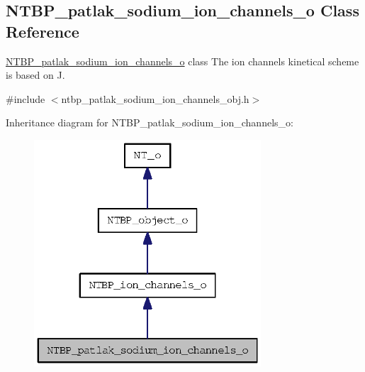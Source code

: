 \subsection{NTBP\_\-patlak\_\-sodium\_\-ion\_\-channels\_\-o Class Reference}
\label{class_n_t_b_p__patlak__sodium__ion__channels__o}


\hyperlink{class_n_t_b_p__patlak__sodium__ion__channels__o}{NTBP\_\-patlak\_\-sodium\_\-ion\_\-channels\_\-o} class The ion channels kinetical scheme is based on J.  




{\ttfamily \#include $<$ntbp\_\-patlak\_\-sodium\_\-ion\_\-channels\_\-obj.h$>$}



Inheritance diagram for NTBP\_\-patlak\_\-sodium\_\-ion\_\-channels\_\-o:
\nopagebreak
\begin{figure}[H]
\begin{center}
\leavevmode
\includegraphics[width=240pt]{class_n_t_b_p__patlak__sodium__ion__channels__o__inherit__graph}
\end{center}
\end{figure}


